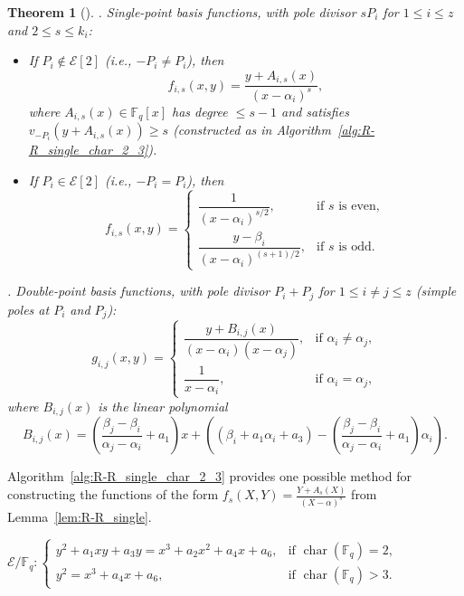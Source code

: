 \documentclass[sn-mathphys-num]{sn-jnl_modified}
\newtheorem{theorem}{Theorem}[subsection]
\begin{document}
\begin{appendices}
\begin{theorem}[{\cite[Theorem 3.1.2]{KM26}}]
. Single-point basis functions, with pole divisor $sP_i$ for $1 \leq i \leq z$ and $2 \leq s \leq k_i$:
\begin{itemize}
\item If $P_i \notin \mathcal{E}[2]$ (i.e., $-P_i \neq P_i$), then
\[
f_{i,s}(x,y) = \frac{y + A_{i,s}(x)}{(x - \alpha_i)^s},
\]
where $A_{i,s}(x) \in \mathbb{F}_{q}[x]$ has degree $\leq s-1$ and satisfies $v_{-P_i}(y + A_{i,s}(x)) \geq s$ (constructed as in Algorithm~\ref{alg:R-R_single_char_2_3}).
\item If $P_i \in \mathcal{E}[2]$ (i.e., $-P_i = P_i$), then
\[
f_{i,s}(x,y) = \begin{cases}
\dfrac{1}{(x-\alpha_i)^{s/2}}, & \text{if } s \text{ is even},\\[8pt]
\dfrac{y - \beta_i}{(x-\alpha_i)^{(s+1)/2}}, & \text{if } s \text{ is odd}.
\end{cases}
\]
\end{itemize}

. Double-point basis functions, with pole divisor $P_i + P_j$ for $1 \leq i \neq j \leq z$ (simple poles at $P_i$ and $P_j$):
\[
g_{i,j}(x,y) = \begin{cases}
\dfrac{y + B_{i,j}(x)}{(x - \alpha_i)(x - \alpha_j)}, & \text{if } \alpha_i \neq \alpha_j,\\[8pt]
\dfrac{1}{x - \alpha_i}, & \text{if } \alpha_i = \alpha_j,
\end{cases}
\]
where $B_{i,j}(x)$ is the linear polynomial
\[
B_{i,j}(x) = \left( \frac{\beta_j - \beta_i}{\alpha_j - \alpha_i} + a_1 \right) x + \left( (\beta_i + a_1\alpha_i + a_3) - \left( \frac{\beta_j - \beta_i}{\alpha_j - \alpha_i} + a_1 \right) \alpha_i \right).
\]
\end{theorem}






Algorithm~\ref{alg:R-R_single_char_2_3} provides one possible method for constructing the functions of the form $f_s(X,Y)=\frac{Y+A_s(X)}{(X-\alpha)^s}$ from Lemma~\ref{lem:R-R_single}.

\begin{algorithm}[ht!]
\fontsize{9pt}{9pt}\selectfont
\caption{Basis for $\mathscr{L}(kP_{\alpha,\beta})$ from \cite{KM26}}
\label{alg:R-R_single_char_2_3}
\begin{algorithmic}[1]
\Require $\mathcal{E}/\mathbb{F}_q:\left\{\begin{array}{cl}
y^2 + a_1xy + a_3y = x^3 + a_2x^2 + a_4x + a_6,      &  \text{if } \operatorname{char}(\mathbb{F}_q) = 2, \\
 y^2 = x^3 + a_4x + a_6,    &  \text{if } \operatorname{char}(\mathbb{F}_q) > 3. 
\end{array}\right.$  


\end{algorithmic}
\end{algorithm}
\end{appendices}
\end{document}
